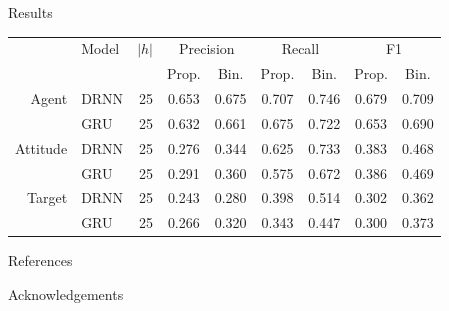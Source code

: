 \documentclass[final]{beamer}
\newlength{\onecolwid}
\begin{document}
\begin{frame}[t]
\begin{columns}[t]
\begin{column}{\onecolwid}
\begin{block}{Results}

\begin{tabular}{r | l r | c c | c c | c c |} \cline{2-9}
                 & Model & $|h|$ & \multicolumn{2}{|c|}{Precision} & \multicolumn{2}{|c|}{Recall} & \multicolumn{2}{|c|}{F1} \\ \cline{2-9}
                 &       &       & Prop. & Bin.  & Prop. & Bin.  & Prop. & Bin. \\ \cline{2-9}
\small{Agent}    & DRNN  & 25    & 0.653 & 0.675 & 0.707 & 0.746 & 0.679 & 0.709 \\
                 & GRU   & 25    & 0.632 & 0.661 & 0.675 & 0.722 & 0.653 & 0.690  \\ \cline{2-9}
\small{Attitude} & DRNN  & 25    & 0.276 & 0.344 & 0.625 & 0.733 & 0.383 & 0.468 \\
                 & GRU   & 25    & 0.291 & 0.360 & 0.575 & 0.672 & 0.386 & 0.469  \\ \cline{2-9}
\small{Target}   & DRNN  & 25    & 0.243 & 0.280 & 0.398 & 0.514 & 0.302 & 0.362 \\
                 & GRU   & 25    & 0.266 & 0.320 & 0.343 & 0.447 & 0.300 & 0.373  \\ \cline{2-9}
\end{tabular}

\end{block}


\begin{block}{References}

\printbibliography

\end{block}



\begin{block}{Acknowledgements}

\small{} \\


\end{block}
\end{column}
\end{columns}
\end{frame}
\end{document}
